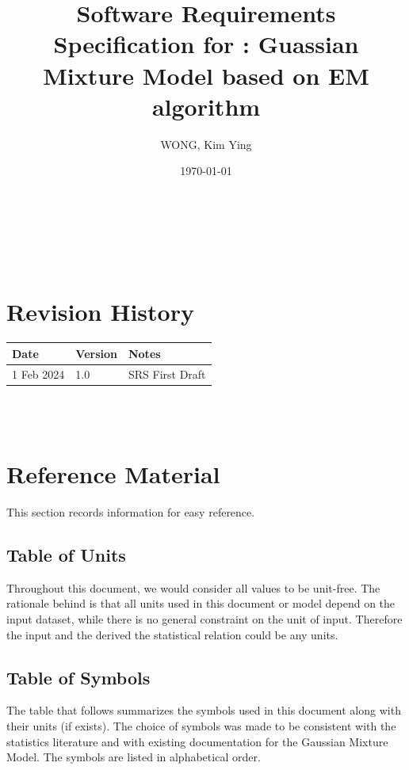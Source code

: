 \documentclass[12pt]{article}
\begin{document}
\title{Software Requirements Specification for \progname: Guassian Mixture Model based on EM algorithm} 
\author{WONG, Kim Ying}
\date{\today}
	
\maketitle

~\newpage


\tableofcontents

~\newpage

\section*{Revision History}

\begin{tabularx}{\textwidth}{p{3cm}p{2cm}X}
\toprule {\bf Date} & {\bf Version} & {\bf Notes}\\
\midrule
1 Feb 2024 & 1.0 & SRS First Draft\\
\bottomrule
\end{tabularx}

~\\


~\newpage

\section{Reference Material}

This section records information for easy reference.

\subsection{Table of Units}

Throughout this document, we would consider all values to be unit-free. The rationale behind is that all units used in this document or model depend on the input dataset, while there is no general constraint on the unit of input. Therefore the input and the derived the statistical relation could be any units.
~\newline

\subsection{Table of Symbols}
\label{subsec:TOS}
The table that follows summarizes the symbols used in this document along with
their units (if exists). The choice of symbols was made to be consistent with the statistics literature and with existing documentation for the Gaussian Mixture Model. The symbols are listed in alphabetical order.
\end{document}
